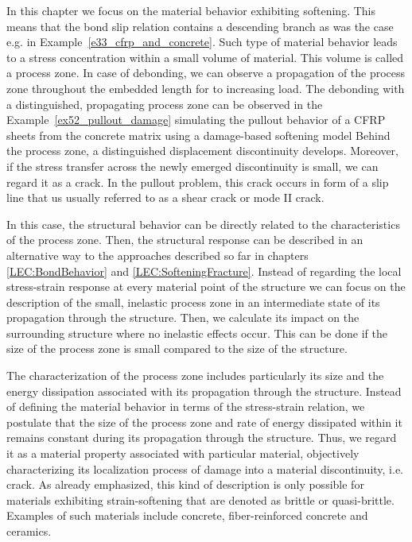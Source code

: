 \documentclass[main.tex]{subfiles}
\begin{document}
In this chapter we focus on the material behavior exhibiting softening. 
This means that the bond slip relation contains a descending branch as was the case e.g. in Example~\ref{e33_cfrp_and_concrete}. 
Such type of material behavior leads to a stress concentration within 
a small volume of material. This volume is called a process zone. 
In case of debonding, we can observe a propagation of the process zone 
throughout the embedded length for to increasing load. The debonding with a distinguished, propagating process zone can be observed in the Example~\ref{ex52_pullout_damage}
simulating the pullout behavior of a CFRP sheets from the concrete matrix using a damage-based softening model  Behind the process zone, 
a distinguished displacement discontinuity develops. Moreover, if the stress transfer across the newly emerged discontinuity is small, we can  regard it 
as a crack. In the pullout problem, this crack occurs in form of a slip line
that us usually referred to as a shear crack or mode II crack.

In this case, the structural behavior can be directly related to the characteristics of the process zone. 
Then, the structural response can be described in an alternative way to the approaches described so far in chapters \ref{LEC:BondBehavior} and \ref{LEC:SofteningFracture}. Instead of regarding the local stress-strain response at every material point of the structure we can focus on the description of the small, inelastic process zone in an intermediate state of its propagation through the structure. Then, we calculate 
its impact on the surrounding structure where no inelastic effects occur. 
This can be done if the size of the process zone is small compared to the size of the structure. 

The characterization of the process zone includes particularly its size and the energy dissipation associated with its propagation through the structure.
Instead of defining the material behavior in terms of the stress-strain relation, we postulate that the size of the process zone and rate of energy dissipated within it remains constant during its propagation through the structure. Thus, we regard it as a material property associated with particular material, objectively characterizing its localization process of damage into a material discontinuity, i.e. crack. As already emphasized, this kind of
description is only possible for materials exhibiting strain-softening that are denoted as brittle or quasi-brittle. Examples of such materials 
include concrete, fiber-reinforced concrete and ceramics.
\end{document}
